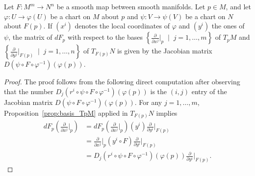\begin{proposition}\label{prop:DiffCoords}
	Let $F:M^m\to N^n$ be a smooth map between smooth manifolds.
	Let $p\in M$, and let $\varphi : U \to \varphi(U)$ be a chart on $M$ about $p$ and $\psi: V \to \psi(V)$ be a chart on $N$ about $F(p)$.
	If $(x^i)$ denotes the local coordinates of $\varphi$ and $(y^i)$ the ones of $\psi$, the matrix of $dF_p$ with respect to the bases $\left\{\frac{\partial}{\partial x^j}\big|_p \;\mid\; j=1,\ldots,m\right\}$ of $T_pM$ and $\left\{\frac{\partial}{\partial y^j}\big|_{F(p)} \;\mid\; j=1,\ldots,n\right\}$ of $T_{F(p)}N$ is given by the Jacobian matrix $D(\psi\circ F \circ\varphi^{-1})(\varphi(p))$.
\end{proposition}
\begin{proof}
	The proof follows from the following direct computation after observing that the number $D_j(r^i \circ \psi \circ F \circ \varphi^{-1})(\varphi(p))$ is the $(i,j)$ entry of the Jacobian matrix $D(\psi\circ F \circ\varphi^{-1})(\varphi(p))$. For any $j=1,\ldots,m$, Proposition~\ref{prop:basis_TpM} applied in $T_{F(p)}N$ implies
	\begin{align}
		dF_p \left(\frac{\partial}{\partial x^j}\Big|_p\right)
		 & =                                                                                                   %
		dF_p \left(\frac{\partial}{\partial x^j}\Big|_p\right) (y^i) \frac{\partial}{\partial y^i}\Big|_{F(p)} \\
		 & =                                                                                                   %
		\frac{\partial}{\partial x^j}\Big|_p (y^i \circ F) \frac{\partial}{\partial y^i}\Big|_{F(p)}           \\
		 & =                                                                                                   %
		D_j(r^i \circ \psi \circ F \circ \varphi^{-1})(\varphi(p)) \frac{\partial}{\partial y^i}\Big|_{F(p)}.
	\end{align}
\end{proof}

